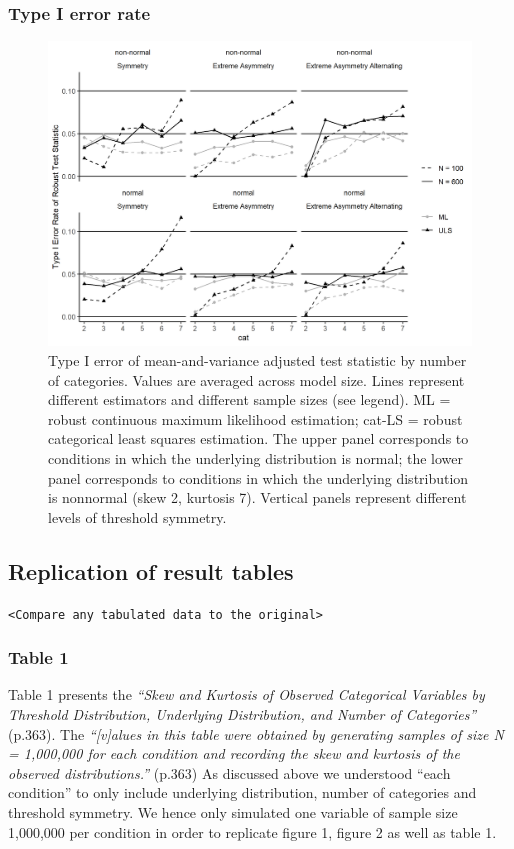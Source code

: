 \documentclass[10,a4paperpaper,]{article}
\begin{document}
\subsubsection{Type I error rate}
\begin{figure}
\includegraphics[width=445pt]{./figures/fig_9} \caption{Type I error of mean-and-variance adjusted test statistic by number of categories. Values are averaged across model size. Lines represent different estimators and different sample sizes (see legend). ML = robust continuous maximum likelihood estimation; cat-LS = robust categorical least squares estimation. The upper panel corresponds to conditions in which the underlying distribution is normal; the lower panel corresponds to conditions in which the underlying distribution is nonnormal (skew 2, kurtosis 7). Vertical panels represent different levels of threshold symmetry.}\label{fig:unnamed-chunk-8}
\end{figure}

\subsection{Replication of result tables}

\texttt{\textless{}Compare\ any\ tabulated\ data\ to\ the\ original\textgreater{}}

\subsubsection{Table 1}

Table 1 presents the \emph{``Skew and Kurtosis of Observed Categorical
Variables by Threshold Distribution, Underlying Distribution, and Number
of Categories''} (p.363). The \emph{``{[}v{]}alues in this table were
obtained by generating samples of size N = 1,000,000 for each condition
and recording the skew and kurtosis of the observed distributions.''}
(p.363) As discussed above we understood ``each condition'' to only
include underlying distribution, number of categories and threshold
symmetry. We hence only simulated one variable of sample size 1,000,000
per condition in order to replicate figure 1, figure 2 as well as table
1.
\end{document}
